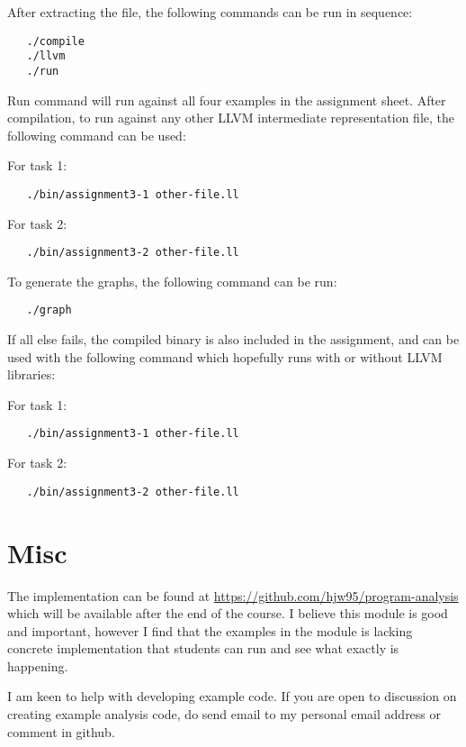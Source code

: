 \documentclass[11pt,a4paper,fleqn]{article}
\begin{document}
After extracting the file, the following commands can be run in sequence:

\begin{verbatim}
   ./compile
   ./llvm
   ./run
\end{verbatim}

Run command will run against all four examples in the assignment sheet. After compilation, to run against any other LLVM intermediate representation file, the following command can be used:

For task 1:
\begin{verbatim}
   ./bin/assignment3-1 other-file.ll
\end{verbatim}

For task 2:
\begin{verbatim}
   ./bin/assignment3-2 other-file.ll
\end{verbatim}

To generate the graphs, the following command can be run:

\begin{verbatim}
   ./graph
\end{verbatim}

If all else fails, the compiled binary is also included in the assignment, and can be used with the following command which hopefully runs with or without LLVM libraries:

For task 1:
\begin{verbatim}
   ./bin/assignment3-1 other-file.ll
\end{verbatim}

For task 2:
\begin{verbatim}
   ./bin/assignment3-2 other-file.ll
\end{verbatim}

\section {Misc}

The implementation can be found at \url{https://github.com/hjw95/program-analysis} which will be available after the end of the course.
I believe this module is good and important, however I find that the examples in the module is lacking concrete implementation that students can run and see what exactly is happening.

I am keen to help with developing example code. If you are open to discussion on creating example analysis code, do send email to my personal email address or comment in github.
\end{document}
